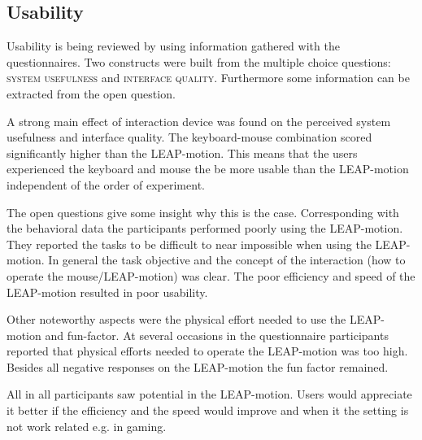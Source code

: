 \subsection{Usability}
Usability is being reviewed by using information gathered with the questionnaires. Two constructs were built from the multiple choice questions: \textsc{system usefulness} and \textsc{interface quality}. Furthermore some information can be extracted from the open question. 

A strong main effect of interaction device was found on the perceived system usefulness and interface quality. The keyboard-mouse combination scored significantly higher than the LEAP-motion. This means that the users experienced the keyboard and mouse the be more usable than the LEAP-motion independent of the order of experiment. 

The open questions give some insight why this is the case. Corresponding with the behavioral data the participants performed poorly using the LEAP-motion. They reported the tasks to be difficult to near impossible when using the LEAP-motion. In general the task objective and the concept of the interaction (how to operate the mouse/LEAP-motion) was clear. The poor efficiency and speed of the LEAP-motion resulted in poor usability. 

Other noteworthy aspects were the physical effort needed to use the LEAP-motion and fun-factor. At several occasions in the questionnaire participants reported that physical efforts needed to operate the LEAP-motion was too high. Besides all negative responses on the LEAP-motion the fun factor remained.

All in all participants saw potential in the LEAP-motion. Users would appreciate it better if the efficiency and the speed would improve and when it the setting is not work related e.g. in gaming. 
